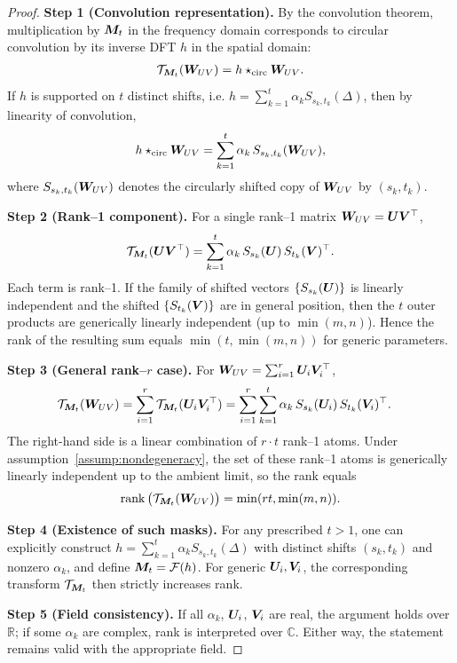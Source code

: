 \documentclass{article}
\theoremstyle{plain}
\theoremstyle{definition}
\theoremstyle{remark}
\begin{document}
\begin{proof}
\textbf{Step 1 (Convolution representation).} 
By the convolution theorem, multiplication by ${\bm{M}}_t$ in the frequency domain corresponds to circular convolution by its inverse DFT $h$ in the spatial domain:
\begin{align}
\mathcal{T}_{{\bm{M}}_t}({\bm{W}}_{UV}) = h \star_{\mathrm{circ}} {\bm{W}}_{UV}.
\end{align}
If $h$ is supported on $t$ distinct shifts, i.e.
$h=\sum_{k=1}^t \alpha_k S_{s_k,t_k}(\Delta)$,
then by linearity of convolution,
\begin{align}
h\star_{\mathrm{circ}} {\bm{W}}_{UV}
  = \sum_{k=1}^t \alpha_k\, S_{s_k,t_k}({\bm{W}}_{UV}),
\end{align}
where $S_{s_k,t_k}({\bm{W}}_{UV})$ denotes the circularly shifted copy of ${\bm{W}}_{UV}$ by $(s_k,t_k)$.

\textbf{Step 2 (Rank--1 component).} 
For a single rank--1 matrix ${\bm{W}}_{UV}={\bm{U}} {\bm{V}}^\top$,
\begin{align}
\mathcal{T}_{{\bm{M}}_t}({\bm{U}} {\bm{V}}^\top)
  = \sum_{k=1}^t \alpha_k\, S_{s_k}({\bm{U}})\,S_{t_k}({\bm{V}})^\top.
\end{align}
Each term is rank--1. 
If the family of shifted vectors $\{S_{s_k}({\bm{U}})\}$ is linearly independent and the shifted $\{S_{t_k}({\bm{V}})\}$ are in general position, then the $t$ outer products are generically linearly independent (up to $\min(m,n)$). 
Hence the rank of the resulting sum equals $\min(t,\min(m,n))$ for generic parameters.

\textbf{Step 3 (General rank--$r$ case).}
For ${\bm{W}}_{UV}=\sum_{i=1}^r {\bm{U}}_i {\bm{V}}_i^\top$,
\begin{align}
\mathcal{T}_{{\bm{M}}_t}({\bm{W}}_{UV})
  &= \sum_{i=1}^r \mathcal{T}_{{\bm{M}}_t}({\bm{U}}_i {\bm{V}}_i^\top)
   = \sum_{i=1}^r \sum_{k=1}^t \alpha_k\, S_{s_k}({\bm{U}}_i)\,S_{t_k}({\bm{V}}_i)^\top.
\end{align}
The right-hand side is a linear combination of $r\!\cdot\!t$ rank--1 atoms. 
Under assumption~\ref{assump:nondegeneracy}, the set of these rank--1 atoms is generically linearly independent up to the ambient limit, so the rank equals
\begin{align}
\operatorname{rank}\big(\mathcal{T}_{{\bm{M}}_t}({\bm{W}}_{UV})\big)
  = \min(r t, \min(m,n)).
\end{align}


\textbf{Step 4 (Existence of such masks).}
For any prescribed $t>1$, one can explicitly construct $h=\sum_{k=1}^t \alpha_k S_{s_k,t_k}(\Delta)$ with distinct shifts $(s_k,t_k)$ and nonzero $\alpha_k$, 
and define ${\bm{M}}_t = \mathcal{F}(h)$. 
For generic ${\bm{U}}_i,{\bm{V}}_i$, the corresponding transform $\mathcal{T}_{{\bm{M}}_t}$ then strictly increases rank.

\textbf{Step 5 (Field consistency).}
If all $\alpha_k$, ${\bm{U}}_i$, ${\bm{V}}_i$ are real, the argument holds over $\mathbb{R}$; 
if some $\alpha_k$ are complex, rank is interpreted over $\mathbb{C}$. 
Either way, the statement remains valid with the appropriate field.
\end{proof}
\end{document}
